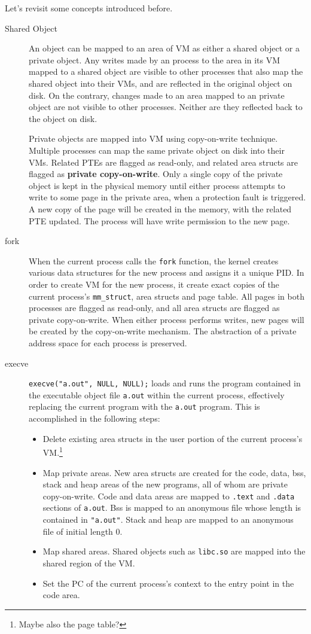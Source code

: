 Let's revisit some concepts introduced before.
\begin{description}
\item[Shared Object]An object can be mapped to an area of VM as either a shared object or a private object. Any writes made by an process to the area in its VM mapped to a shared object are visible to other processes that also map the shared object into their VMs, and are reflected in the original object on disk. On the contrary, changes made to an area mapped to an private object are not visible to other processes. Neither are they reflected back to the object on disk. 

Private objects are mapped into VM using copy-on-write technique. Multiple processes can map the same private object on disk into their VMs. Related PTEs are flagged as read-only, and related area structs are flagged as \textbf{private copy-on-write}. Only a single copy of the private object is kept in the physical memory until either process attempts to write to some page in the private area, when a protection fault is triggered. A new copy of the page will be created in the memory, with the related PTE updated. The process will have write permission to the new page.
\item[fork]When the current process calls the \texttt{fork} function, the kernel creates various data structures for the new process and assigns it a unique PID. In order to create VM for the new process, it create exact copies of the current process's \texttt{mm\_struct}, area structs and page table. All pages in both processes are flagged as read-only, and all area structs are flagged as private copy-on-write. When either process performs writes, new pages will be created by the copy-on-write mechanism. The abstraction of a private address space for each process is preserved.
\item[execve]\texttt{execve("a.out", NULL, NULL);} loads and runs the program contained in the executable object file \texttt{a.out} within the current process, effectively replacing the current program with the \texttt{a.out} program. This is accomplished in the following steps:
\begin{itemize}
	\item Delete existing area structs in the user portion of the current process's VM.\footnote{Maybe also the page table?}
	\item Map private areas. New area structs are created for the code, data, bss, stack and heap areas of the new programs, all of whom are private copy-on-write. Code and data areas are mapped to \texttt{.text} and \texttt{.data} sections of \texttt{a.out}. Bss is mapped to an anonymous file whose length is contained in \texttt{"a.out"}. Stack and heap are mapped to an anonymous file of initial length 0. 
	\item Map shared areas. Shared objects such as \texttt{libc.so} are mapped into the shared region of the VM.
	\item Set the PC of the current process's context to the entry point in the code area. 
\end{itemize}
\end{description}

